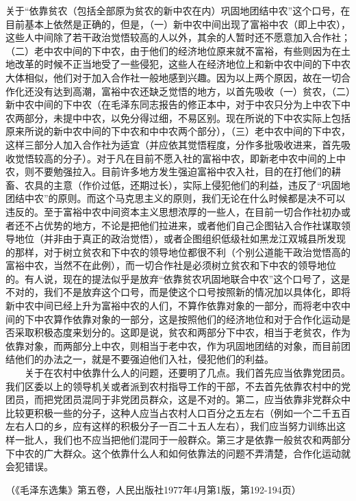\documentclass[cn,11pt,chinese]{elegantbook}
\begin{document}
关于“依靠贫农（包括全部原为贫农的新中农在内）巩固地团结中农”这个口号，在目前基本上依然是正确的，但是，（一）新中农中间出现了富裕中农（即上中农），这些人中间除了若干政治觉悟较高的人以外，其余的人暂时还不愿意加入合作社；（二）老中农中间的下中农，由于他们的经济地位原来就不富裕，有些则因为在土地改革的时候不正当地受了一些侵犯，这些人在经济地位上和新中农中间的下中农大体相似，他们对于加入合作社一般地感到兴趣。因为以上两个原因，故在一切合作化还没有达到高潮，富裕中农还缺乏觉悟的地方，以首先吸收（一）贫农，（二）新中农中间的下中农（在毛泽东同志报告的修正本中，对于中农只分为上中农下中农两部分，未提中中农，以免分得过细，不易区别。现在所说的下中农实际上包括原来所说的新中农中间的下中农和中中农两个部分），（三）老中农中间的下中农，这样三部分人加入合作社为适宜（并应依其觉悟程度，分作多批吸收进来，首先吸收觉悟较高的分子）。对于凡在目前不愿入社的富裕中农，即新老中农中间的上中农，则不要勉强拉入。目前许多地方发生强迫富裕中农入社，目的在打他们的耕畜、农具的主意（作价过低，还期过长），实际上侵犯他们的利益，违反了“巩固地团结中农”的原则。而这个马克思主义的原则，我们无论在什么时候都是决不可以违反的。至于富裕中农中间资本主义思想浓厚的一些人，在目前一切合作社初办或者还不占优势的地方，不论是把他们拉进来，或者他们自己企图钻入合作社谋取领导地位（并非由于真正的政治觉悟），或者企图组织低级社如黑龙江双城县所发现的那样，对于树立贫农和下中农的领导地位都很不利（个别公道能干政治觉悟高的富裕中农，当然不在此例），而一切合作社是必须树立贫农和下中农的领导地位的。有人说，现在的提法似乎是放弃“依靠贫农巩固地联合中农”这个口号了，这是不对的，我们不是放弃这个口号，而是使这个口号按照新的情况加以具体化，即将新中农中间已经上升为富裕中农的人们，不算作依靠对象的一部分，而将老中农中间的下中农算作依靠对象的一部分，这是按照他们的经济地位和对于合作化运动是否采取积极态度来划分的。这即是说，贫农和两部分下中农，相当于老贫农，作为依靠对象，而两部分上中农，则相当于老中农，作为巩固地团结的对象，而目前团结他们的办法之一，就是不要强迫他们入社，侵犯他们的利益。\\
　　关于在农村中依靠什么人的问题，还要明了几点。我们首先应当依靠党团员。我们区委以上的领导机关或者派到农村指导工作的干部，不去首先依靠农村中的党团员，而把党团员混同于非党团员群众，这是不对的。第二，应当依靠非党群众中比较更积极一些的分子，这种人应当占农村人口百分之五左右（例如一个二千五百左右人口的乡，应有这样的积极分子一百二十五人左右），我们应当努力训练出这样一批人，我们也不应当把他们混同于一般群众。第三才是依靠一般贫农和两部分下中农的广大群众。这个依靠什么人和如何依靠法的问题不弄清楚，合作化运动就会犯错误。\\
\begin{flushright}（《毛泽东选集》第五卷，人民出版社1977年4月第1版，第192-194页）\end{flushright}
\newpage
\end{document}
